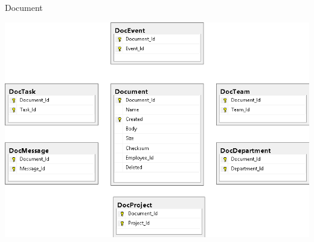 \begin{frame}{Document}
  \begin{center}
    \includegraphics[height=0.9\textheight]{images/database/Document.png}
  \end{center}
\end{frame}